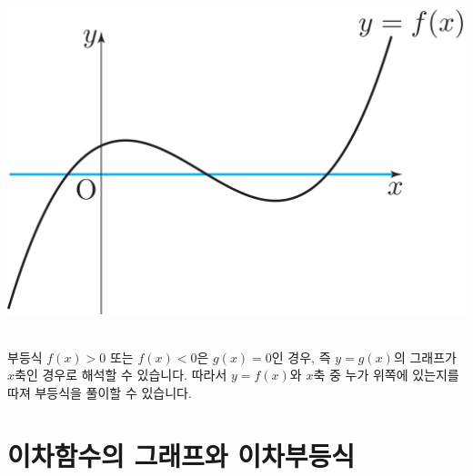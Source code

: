 \begin{center} \includegraphics[scale=\pgfkeysvalueof{picsize}]{DBs/pic/zery_22.pdf}\
	\end{center}부등식 $f\left( x \right) > 0$ 또는 $f\left( x \right) <0 $은 $g\left( x \right)=0 $인 경우, 즉 $y=g\left( x \right) $의 그래프가 \mbox{$x$축인} 경우로 해석할 수 있습니다. 따라서 $y=f\left( x \right) $와 $x$축 중 누가 위쪽에 있는지를 따져 부등식을 풀이할 수 있습니다.\vskip-10pt



\section{이차함수의 그래프와 이차부등식}
